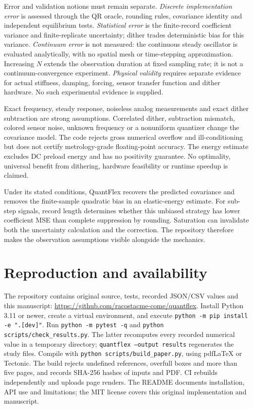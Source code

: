 \documentclass[10pt,a4paper]{article}
\begin{document}
Error and validation notions must remain separate. \emph{Discrete implementation error}
is assessed through the QR oracle, rounding rules, covariance identity and
independent equilibrium tests. \emph{Statistical error} is the finite-record
coefficient variance and finite-replicate uncertainty; dither trades deterministic
bias for this variance. \emph{Continuum error} is not measured: the continuous
steady oscillator is evaluated analytically, with no spatial mesh or time-stepping
approximation. Increasing $N$ extends the observation duration at fixed sampling
rate; it is not a continuum-convergence experiment. \emph{Physical validity}
requires separate evidence for actual stiffness, damping, forcing, sensor transfer
function and dither hardware. No such experimental evidence is supplied.

Exact frequency, steady response, noiseless analog measurements and exact dither
subtraction are strong assumptions. Correlated dither, subtraction mismatch,
colored sensor noise, unknown frequency or a nonuniform quantizer change the
covariance model. The code rejects gross numerical overflow and ill-conditioning
but does not certify metrology-grade floating-point accuracy. The energy estimate
excludes DC preload energy and has no positivity guarantee. No optimality,
universal benefit from dithering, hardware feasibility or runtime speedup is claimed.

Under its stated conditions, QuantFlex recovers the predicted covariance and
removes the finite-sample quadratic bias in an elastic-energy estimate. For
sub-step signals, record length determines whether this unbiased strategy has
lower coefficient MSE than complete suppression by rounding. Saturation can
invalidate both the uncertainty calculation and the correction. The repository
therefore makes the observation assumptions visible alongside the mechanics.

\section*{Reproduction and availability}
The repository contains original source, tests, recorded JSON/CSV values and
this manuscript: \url{https://github.com/racostacme-come/quantflex}.
Install Python 3.11 or newer, create a virtual environment, and execute
\texttt{python -m pip install -e ".[dev]"}.
Run \texttt{python -m pytest -q} and \texttt{python scripts/check\_results.py}.
The latter recomputes every recorded numerical value in a temporary directory;
\texttt{quantflex --output results} regenerates the study files.
Compile with \texttt{python scripts/build\_paper.py}, using pdfLaTeX or Tectonic.
The build rejects undefined references, overfull boxes and more than five pages,
and records SHA-256 hashes of inputs and PDF. CI rebuilds independently and
uploads page renders. The README documents installation, API use and limitations;
the MIT license covers this original implementation and manuscript.
\end{document}
